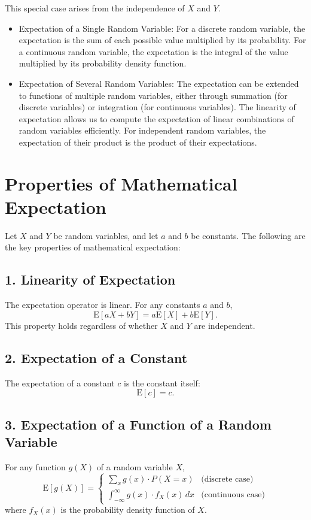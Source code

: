 \documentclass{tufte-handout}
\begin{document}
This special case arises from the independence of \( X \) and \( Y \).


\begin{itemize}

\item Expectation of a Single Random Variable: For a discrete random variable, the expectation is the sum of each possible value multiplied by its probability. For a continuous random variable, the expectation is the integral of the value multiplied by its probability density function.

\item Expectation of Several Random Variables: The expectation can be extended to functions of multiple random variables, either through summation (for discrete variables) or integration (for continuous variables). The linearity of expectation allows us to compute the expectation of linear combinations of random variables efficiently. For independent random variables, the expectation of their product is the product of their expectations.

\end{itemize}



\section*{Properties of Mathematical Expectation}

Let \( X \) and \( Y \) be random variables, and let \( a \) and \( b \) be constants. The following are the key properties of mathematical expectation:

\subsection*{1. Linearity of Expectation}
The expectation operator is linear. For any constants \( a \) and \( b \),
\[
\mathrm{E}[aX + bY] = a\mathrm{E}[X] + b\mathrm{E}[Y].
\]
This property holds regardless of whether \( X \) and \( Y \) are independent.

\subsection*{2. Expectation of a Constant}
The expectation of a constant \( c \) is the constant itself:
\[
\mathrm{E}[c] = c.
\]

\subsection*{3. Expectation of a Function of a Random Variable}
For any function \( g(X) \) of a random variable \( X \),
\[
\mathrm{E}[g(X)] = \begin{cases}
\sum_{x} g(x) \cdot P(X = x) & \text{(discrete case)} \\
\int_{-\infty}^{\infty} g(x) \cdot f_X(x) \, dx & \text{(continuous case)}
\end{cases}
\]
where \( f_X(x) \) is the probability density function of \( X \).
\end{document}
